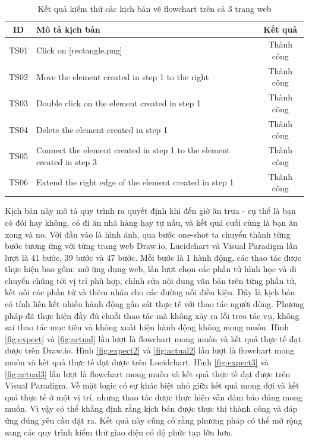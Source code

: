 \documentclass[a4paper, 12pt]{report}
\begin{document}
{\begin{table}[!hbt]
\centering
\caption{Kết quả kiểm thử các kịch bản vẽ flowchart trên cả 3 trang web}
\label{tab:bang4.5}
\begin{tabular}{|c|p{11cm}|c|}
\hline
\textbf{ID} & \textbf{Mô tả kịch bản} & \textbf{Kết quả} \\ \hline
TS01 & Click on [rectangle.png] & Thành công \\ \hline
TS02 & Move the element created in step 1 to the right & Thành công \\ \hline
TS03 & Double click on the element created in step 1 & Thành công \\ \hline
TS04 & Delete the element created in step 1 & Thành công \\ \hline
TS05 & Connect the element created in step 1 to the element created in step 3 & Thành công \\ \hline
TS06 & Extend the right edge of the element created in step 1 & Thành công \\ \hline
\end{tabular}
\end{table}






Kịch bản này mô tả quy trình ra quyết định khi đến giờ ăn trưa - cụ thể là bạn có đói hay không, có đi ăn nhà hàng hay tự nấu, và kết quả cuối cùng là bạn ăn xong và no.
Với đầu vào là hình ảnh, qua bước one-shot ta chuyển thành từng bước tương ứng với từng trang web Draw.io, Lucidchart và Visual Paradigm lần lượt là 41 bước, 39 bước và 47 bước.
Mỗi bước là 1 hành động, các thao tác được thực hiện bao gồm: mở ứng dụng web, lần lượt chọn các phần tử hình học và di chuyển chúng tới vị trí phù hợp, chỉnh sửa nội dung văn bản trên từng phần tử, kết nối các phần tử và thêm nhãn cho các đường nối điều kiện. Đây là kịch bản có tính liên kết nhiều hành động gần sát thực tế với thao tác người dùng. Phương pháp đã thực hiện đầy đủ chuỗi thao tác mà không xảy ra lỗi treo tác vụ, không sai thao tác mục tiêu và không xuất hiện hành động không mong muốn. Hình \ref{fig:expect} và \ref{fig:actual} lần lượt là flowchart mong muốn và kết quả thực tế đạt được trên Draw.io. Hình \ref{fig:expect2} và \ref{fig:actual2} lần lượt là flowchart mong muốn và kết quả thực tế đạt được trên Lucidchart. Hình \ref{fig:expect3} và \ref{fig:actual3} lần lượt là flowchart mong muốn và kết quả thực tế đạt được trên Visual Paradigm. Về mặt logic có sự khác biệt nhỏ giữa kết quả mong đợi và kết quả thực tế ở một vị trí, nhưng thao tác được thực hiện vẫn đảm bảo đúng mong muốn. Vì vậy có thể khẳng định rằng kịch bản được thực thi thành công và đáp ứng đúng yêu cầu đặt ra. Kết quả này cũng cố rằng phương pháp có thể mở rộng sang các quy trình kiểm thử giao diện có độ phức tạp lớn hơn.



}
\end{document}
